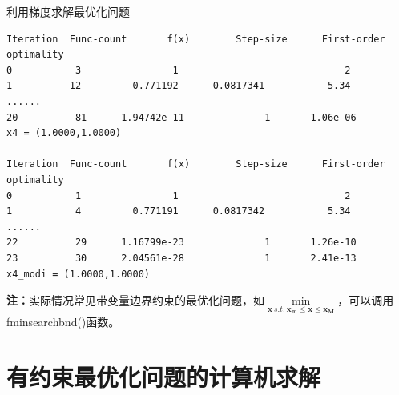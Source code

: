 \documentclass[12pt]{beamer}
\begin{document}
\begin{frame}[fragile]{利用梯度求解最优化问题}

\begin{lstlisting}                                            
Iteration  Func-count       f(x)        Step-size      First-order optimality
0           3                1                             2
1          12         0.771192      0.0817341           5.34  
......
20          81      1.94742e-11              1       1.06e-06
x4 = (1.0000,1.0000)
                   
Iteration  Func-count       f(x)        Step-size      First-order optimality
0           1                1                             2
1           4         0.771191      0.0817342           5.34  
......
22          29      1.16799e-23              1       1.26e-10
23          30      2.04561e-28              1       2.41e-13
x4_modi = (1.0000,1.0000)
\end{lstlisting}

\textbf{注：}实际情况常见带变量边界约束的最优化问题，如$\min\limits_{\mathbf{x}\ s.t.\ \mathbf{x_m} \leqslant \mathbf{x} \leqslant \mathbf{x_M}}$，可以调用fminsearchbnd()函数。

\end{frame}

\section{有约束最优化问题的计算机求解}
\end{document}
